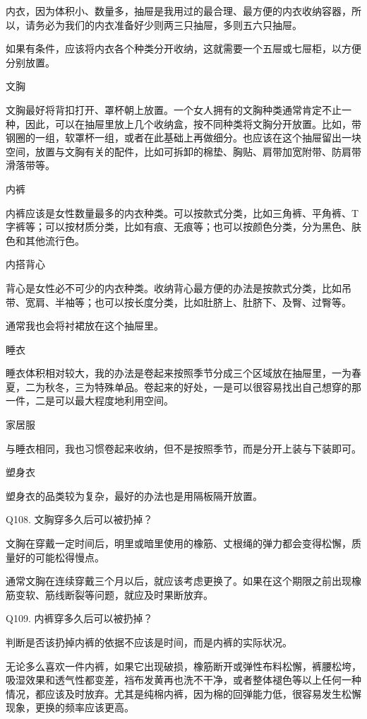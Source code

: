 \documentclass[12pt,UTF8]{ctexbook}
\begin{document}
内衣，因为体积小、数量多，抽屉是我用过的最合理、最方便的内衣收纳容器，所以，请务必为我们的内衣准备好少则两三只抽屉，多则五六只抽屉。

如果有条件，应该将内衣各个种类分开收纳，这就需要一个五屉或七屉柜，以方便分别放置。

文胸

文胸最好将背扣打开、罩杯朝上放置。一个女人拥有的文胸种类通常肯定不止一种，因此，可以在抽屉里放上几个收纳盒，按不同种类将文胸分开放置。比如，带钢圈的一组，软罩杯一组，或者在此基础上再做细分。也应该在这个抽屉留出一块空间，放置与文胸有关的配件，比如可拆卸的棉垫、胸贴、肩带加宽附带、防肩带滑落带等。

内裤

内裤应该是女性数量最多的内衣种类。可以按款式分类，比如三角裤、平角裤、T字裤等；可以按材质分类，比如有痕、无痕等；也可以按颜色分类，分为黑色、肤色和其他流行色。

内搭背心

背心是女性必不可少的内衣种类。收纳背心最方便的办法是按款式分类，比如吊带、宽肩、半袖等；也可以按长度分类，比如肚脐上、肚脐下、及臀、过臀等。

通常我也会将衬裙放在这个抽屉里。

睡衣

睡衣体积相对较大，我的办法是卷起来按照季节分成三个区域放在抽屉里，一为春夏，二为秋冬，三为特殊单品。卷起来的好处，一是可以很容易找出自己想穿的那一件，二是可以最大程度地利用空间。



家居服

与睡衣相同，我也习惯卷起来收纳，但不是按照季节，而是分开上装与下装即可。

塑身衣

塑身衣的品类较为复杂，最好的办法也是用隔板隔开放置。





Q108. 文胸穿多久后可以被扔掉？


文胸在穿戴一定时间后，明里或暗里使用的橡筋、丈根绳的弹力都会变得松懈，质量好的可能松得慢点。

通常文胸在连续穿戴三个月以后，就应该考虑更换了。如果在这个期限之前出现橡筋变软、筋线断裂等问题，就应及时果断放弃。





Q109. 内裤穿多久后可以被扔掉？


判断是否该扔掉内裤的依据不应该是时间，而是内裤的实际状况。

无论多么喜欢一件内裤，如果它出现破损，橡筋断开或弹性布料松懈，裤腰松垮，吸湿效果和透气性都变差，裆布发黄再也洗不干净，或者整体褪色等以上任何一种情况，都应该及时放弃。尤其是纯棉内裤，因为棉的回弹能力低，很容易发生松懈现象，更换的频率应该更高。
\end{document}
